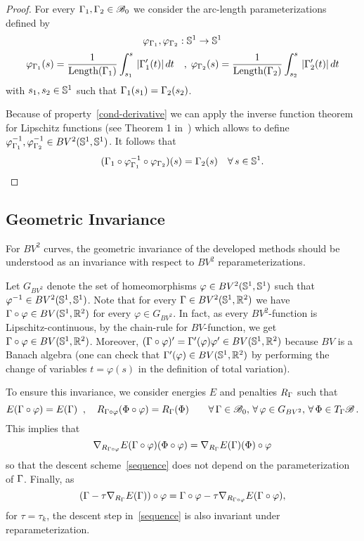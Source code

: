 \begin{proof}
For every $\Gamma_1, \Gamma_2\in\mathcal{B}_0$ we consider the arc-length parameterizations defined by
$$\varphi_{\Gamma_1}, \varphi_{\Gamma_2} : \mathbb{S}^1 \rightarrow \mathbb{S}^1$$
$$\varphi_{\Gamma_1}(s) = \frac{1}{\mbox{Length}(\Gamma_1)}\int_{s_1}^s \,|\Gamma_1'(t)| \,dt \quad ,\;\varphi_{\Gamma_2}(s) = \frac{1}{\mbox{Length}(\Gamma_2)}\int_{s_2}^s \,|\Gamma_2'(t)|\,dt $$
with $s_1, s_2\in \mathbb{S}^1$ such that $\Gamma_1(s_1)=\Gamma_2(s_2)$.

Because of property~\eqref{cond-derivative} we can apply the inverse function theorem for Lipschitz functions (see Theorem 1 in~\cite{Clarke}) which allows to define  %
$\varphi_{\Gamma_1}^{-1}, \varphi_{\Gamma_2}^{-1}\in BV^2(\mathbb{S}^1, \mathbb{S}^1)$. It follows that
$$(\Gamma_1 \circ \varphi_{\Gamma_1}^{-1} \circ \varphi_{\Gamma_2})(s) = \Gamma_2(s)\quad \forall \, s\in \mathbb{S}^1.$$
\end{proof}



\subsection{Geometric Invariance}

For $BV^2$ curves, the geometric invariance of the developed methods should be understood as an invariance with respect to $BV^2$ reparameterizations. 

\begin{defn}
	Let $G_{BV^2}$ denote the set of homeomorphisms  $\varphi\in BV^2(\mathbb{S}^1,\mathbb{S}^1)$ such that $\varphi^{-1} \in BV^2(\mathbb{S}^1,\mathbb{S}^1)$. 
 Note that for every $\Gamma \in BV^2(\mathbb{S}^1, \mathbb{R}^2)$ we have $\Gamma\circ \varphi \in BV(\mathbb{S}^1, \mathbb{R}^2)$ for every $\varphi\in G_{BV^2}$. In fact, as every $BV^2$-function  is Lipschitz-continuous, by the chain-rule for $BV$-function, we get $\Gamma\circ \varphi \in BV(\mathbb{S}^1, \mathbb{R}^2)$. Moreover, $(\Gamma\circ \varphi)'= \Gamma'(\varphi)\varphi' \in BV(\mathbb{S}^1, \mathbb{R}^2)$ because $BV$ is a Banach algebra (one can check that $\Gamma'(\varphi)\in BV(\mathbb{S}^1, \mathbb{R}^2)$ by performing the change of variables $t=\varphi(s)$ in the definition of total variation).   
\end{defn}

To ensure this invariance, we consider energies $E$ and penalties $R_\Gamma$ such that
$$
	E(\Gamma\circ\varphi) = E(\Gamma)\;\;, \quad R_{\Gamma\circ\varphi}(\Phi\circ\varphi) = R_{\Gamma}(\Phi)\quad\quad  \forall \, \Gamma \in \mathcal{B}_0,\,\forall \, \varphi \in G_{BV^2} ,\,\forall \,\Phi \in T_\Gamma\mathcal{B}\,.
$$
This implies that 
$$\nabla_{R_{\Gamma\circ\varphi}}E(\Gamma\circ\varphi)(\Phi\circ\varphi)= \nabla_{R_{\Gamma}}E(\Gamma)(\Phi)\circ\varphi$$
so that the descent scheme~\eqref{sequence} does not depend on the parameterization of $\Gamma$. Finally, as 
$$(\Gamma - \tau\nabla_{R_{\Gamma}} E(\Gamma))\circ \varphi = \Gamma\circ \varphi  - \tau\nabla_{R_{\Gamma\circ \varphi }} E(\Gamma\circ \varphi ), $$
for $\tau=\tau_k$, the descent step in~\eqref{sequence} is also invariant under reparameterization. 

